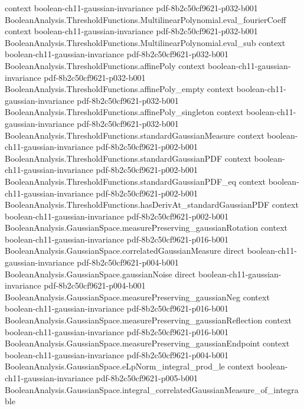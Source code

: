 \begin{theorem}
  {context}
  {boolean-ch11-gaussian-invariance}
  {pdf-8b2c50cf9621-p032-b001}
\proofstep
  {BooleanAnalysis.ThresholdFunctions.MultilinearPolynomial.eval_fourierCoeff}
  {context}
  {boolean-ch11-gaussian-invariance}
  {pdf-8b2c50cf9621-p032-b001}
\proofstep
  {BooleanAnalysis.ThresholdFunctions.MultilinearPolynomial.eval_sub}
  {context}
  {boolean-ch11-gaussian-invariance}
  {pdf-8b2c50cf9621-p032-b001}
\proofstep
  {BooleanAnalysis.ThresholdFunctions.affinePoly}
  {context}
  {boolean-ch11-gaussian-invariance}
  {pdf-8b2c50cf9621-p032-b001}
\proofstep
  {BooleanAnalysis.ThresholdFunctions.affinePoly_empty}
  {context}
  {boolean-ch11-gaussian-invariance}
  {pdf-8b2c50cf9621-p032-b001}
\proofstep
  {BooleanAnalysis.ThresholdFunctions.affinePoly_singleton}
  {context}
  {boolean-ch11-gaussian-invariance}
  {pdf-8b2c50cf9621-p032-b001}
\proofstep
  {BooleanAnalysis.ThresholdFunctions.standardGaussianMeasure}
  {context}
  {boolean-ch11-gaussian-invariance}
  {pdf-8b2c50cf9621-p002-b001}
\proofstep
  {BooleanAnalysis.ThresholdFunctions.standardGaussianPDF}
  {context}
  {boolean-ch11-gaussian-invariance}
  {pdf-8b2c50cf9621-p002-b001}
\proofstep
  {BooleanAnalysis.ThresholdFunctions.standardGaussianPDF_eq}
  {context}
  {boolean-ch11-gaussian-invariance}
  {pdf-8b2c50cf9621-p002-b001}
\proofstep
  {BooleanAnalysis.ThresholdFunctions.hasDerivAt_standardGaussianPDF}
  {context}
  {boolean-ch11-gaussian-invariance}
  {pdf-8b2c50cf9621-p002-b001}
\proofstep
  {BooleanAnalysis.GaussianSpace.measurePreserving_gaussianRotation}
  {context}
  {boolean-ch11-gaussian-invariance}
  {pdf-8b2c50cf9621-p016-b001}
\proofstep
  {BooleanAnalysis.GaussianSpace.correlatedGaussianMeasure}
  {direct}
  {boolean-ch11-gaussian-invariance}
  {pdf-8b2c50cf9621-p004-b001}
\proofstep
  {BooleanAnalysis.GaussianSpace.gaussianNoise}
  {direct}
  {boolean-ch11-gaussian-invariance}
  {pdf-8b2c50cf9621-p004-b001}
\proofstep
  {BooleanAnalysis.GaussianSpace.measurePreserving_gaussianNeg}
  {context}
  {boolean-ch11-gaussian-invariance}
  {pdf-8b2c50cf9621-p016-b001}
\proofstep
  {BooleanAnalysis.GaussianSpace.measurePreserving_gaussianReflection}
  {context}
  {boolean-ch11-gaussian-invariance}
  {pdf-8b2c50cf9621-p016-b001}
\proofstep
  {BooleanAnalysis.GaussianSpace.measurePreserving_gaussianEndpoint}
  {context}
  {boolean-ch11-gaussian-invariance}
  {pdf-8b2c50cf9621-p004-b001}
\proofstep
  {BooleanAnalysis.GaussianSpace.eLpNorm_integral_prod_le}
  {context}
  {boolean-ch11-gaussian-invariance}
  {pdf-8b2c50cf9621-p005-b001}
\proofstep
  {BooleanAnalysis.GaussianSpace.integral_correlatedGaussianMeasure_of_integrable}

\end{theorem}
